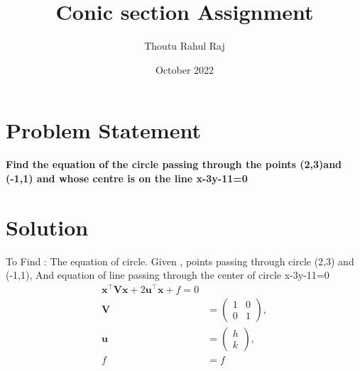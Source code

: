 \documentclass[journal,10pt,twocolumn]{article}
\title{\textbf{Conic section Assignment}}
\author{Thoutu Rahul Raj}
\date{October 2022}
\let\vec\mathbf
\newcommand{\myvec}[1]{\ensuremath{\begin{pmatrix}#1\end{pmatrix}}}
\begin{document}
\maketitle
\section{Problem Statement}
\textbf{Find the equation of the circle passing through the points (2,3)and (-1,1) and whose centre is on the line x-3y-11=0}
\section{Solution}
To Find : The equation of circle.
Given , points passing through circle (2,3) and (-1,1), And equation of line passing through the center of circle x-3y-11=0
\begin{align}
    \vec{x}^{\top}\vec{V}\vec{x}+2\vec{u}^{\top}\vec{x}+f=0\\
	\vec{V} &= \myvec{1 & 0\\0 & 1},
	\\
	\vec{u} &= \myvec{h\\k},
	\\
	f &= f
\end{align}
\end{document}
